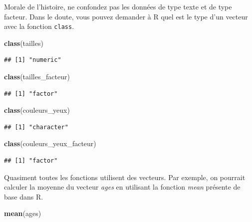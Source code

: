 \documentclass[
  11pt,
  french,
]{book}
\makeatletter
\newenvironment{Shaded}{\begin{snugshade}}{\end{snugshade}}
\newcommand{\KeywordTok}[1]{\textcolor[rgb]{0.13,0.29,0.53}{\textbf{#1}}}
\newcommand{\NormalTok}[1]{#1}
\newenvironment{kframe}{%
\medskip{}
\setlength{\fboxsep}{.8em}
 \def\at@end@of@kframe{}%
 \ifinner\ifhmode%
  \def\at@end@of@kframe{\end{minipage}}%
  \begin{minipage}{\columnwidth}%
 \fi\fi%
 \def\FrameCommand##1{\hskip\@totalleftmargin \hskip-\fboxsep
 \colorbox{shadecolor}{##1}\hskip-\fboxsep
     \hskip-\linewidth \hskip-\@totalleftmargin \hskip\columnwidth}%
 \MakeFramed {\advance\hsize-\width
   \@totalleftmargin\z@ \linewidth\hsize
   \@setminipage}}%
 {\par\unskip\endMakeFramed%
 \at@end@of@kframe}
\newenvironment{kframev}{%
\medskip{}
\setlength{\fboxsep}{.8em}
 \def\at@end@of@kframev{}%
 \ifinner\ifhmode%
  \def\at@end@of@kframev{\end{minipage}}%
  \begin{minipage}{\columnwidth}%
 \fi\fi%
 \def\FrameCommand##1{\hskip\@totalleftmargin \hskip-\fboxsep
 \colorbox{shadebluecolor}{##1}\hskip-\fboxsep
     \hskip-\linewidth \hskip-\@totalleftmargin \hskip\columnwidth}%
 \MakeFramed {\advance\hsize-\width
   \@totalleftmargin\z@ \linewidth\hsize
   \@setminipage}}%
 {\par\unskip\endMakeFramed%
 \at@end@of@kframev}
\renewenvironment{Shaded}{\begin{kframe}}{\end{kframe}}
\newenvironment{rmdblock}[1]
  {
  \begin{itemize}
  \renewcommand{\labelitemi}{
    \raisebox{-.7\height}[0pt][0pt]{
      {\setkeys{Gin}{width=3em,keepaspectratio}\texttt{[image: images/\#1]}}
    }
  }
  \setlength{\fboxsep}{1em}
  \begin{kframev}
  \small
  \item
  }
  {
  \end{kframev}
  \end{itemize}
  }
\newenvironment{bloc_attention}
  {\begin{rmdblock}{attention}}
  {\end{rmdblock}}
\makeatother
\begin{document}
\begin{bloc_attention}
Morale de l'histoire, ne confondez pas les données de type texte et de type facteur. Dans le doute, vous pouvez demander à R quel est le type d'un vecteur avec la fonction \texttt{class}.

\begin{Shaded}
\begin{Highlighting}[]
\KeywordTok{class}\NormalTok{(tailles)}
\end{Highlighting}
\end{Shaded}

\begin{verbatim}
## [1] "numeric"
\end{verbatim}

\begin{Shaded}
\begin{Highlighting}[]
\KeywordTok{class}\NormalTok{(tailles_facteur)}
\end{Highlighting}
\end{Shaded}

\begin{verbatim}
## [1] "factor"
\end{verbatim}

\begin{Shaded}
\begin{Highlighting}[]
\KeywordTok{class}\NormalTok{(couleurs_yeux)}
\end{Highlighting}
\end{Shaded}

\begin{verbatim}
## [1] "character"
\end{verbatim}

\begin{Shaded}
\begin{Highlighting}[]
\KeywordTok{class}\NormalTok{(couleurs_yeux_facteur)}
\end{Highlighting}
\end{Shaded}

\begin{verbatim}
## [1] "factor"
\end{verbatim}


\end{bloc_attention}

Quasiment toutes les fonctions utilisent des vecteurs. Par exemple, on pourrait calculer la moyenne du vecteur \emph{ages} en utilisant la fonction \emph{mean} présente de base dans R.

\begin{Shaded}
\begin{Highlighting}[]
\KeywordTok{mean}\NormalTok{(ages)}
\end{Highlighting}
\end{Shaded}
\end{document}
